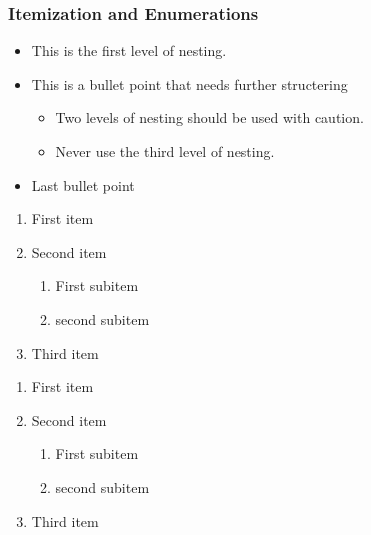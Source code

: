 \documentclass[
	9pt,							%
	mathserif, 				%
	aspectratio=169		%
]{beamer}
\begin{document}
\begin{frame}
	\frametitle{Itemization and Enumerations}

	\begin{itemize}
		\item 
			This is the first level of nesting. 

		\item 
			This is a bullet point that needs further structering

			\begin{itemize}
				\item 
					Two levels of nesting should be used with caution. 

				\item
					Never use the third level of nesting. 
			\end{itemize}

		\item
			Last bullet point 
	\end{itemize}

	\begin{enumerate}
		\item First item

		\item Second item

			\begin{enumerate}
				\item First subitem

				\item second subitem
			\end{enumerate}

		\item Third item
	\end{enumerate}

	\begin{example}
	\begin{enumerate}
		\item First item

		\item Second item

			\begin{enumerate}
				\item First subitem

				\item second subitem
			\end{enumerate}

		\item Third item
	\end{enumerate}

	\end{example}

\end{frame}
\end{document}
